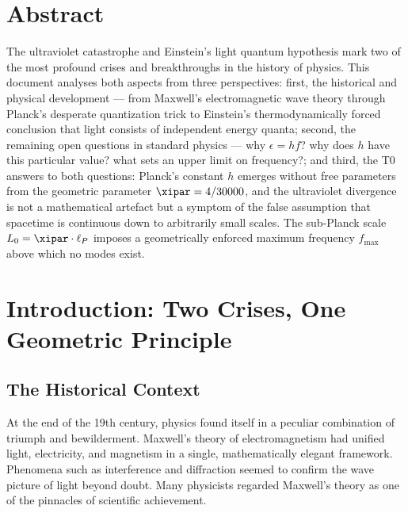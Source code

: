 
\section*{Abstract}

The ultraviolet catastrophe and Einstein's light quantum hypothesis mark two of the 
most profound crises and breakthroughs in the history of physics. This document 
analyses both aspects from three perspectives: first, the historical and physical 
development — from Maxwell's electromagnetic wave theory through Planck's desperate 
quantization trick to Einstein's thermodynamically forced conclusion that light consists 
of independent energy quanta; second, the remaining open questions in standard 
physics — why $\epsilon = hf$? why does $h$ have this particular value? what sets 
an upper limit on frequency?; and third, the T0 answers to both questions: Planck's 
constant $h$ emerges without free parameters from the geometric parameter 
$\xipar = 4/30000$, and the ultraviolet divergence is not a mathematical artefact 
but a symptom of the false assumption that spacetime is continuous down to arbitrarily 
small scales. The sub-Planck scale $L_0 = \xipar \cdot \ell_P$ imposes a geometrically 
enforced maximum frequency $f_{\max}$ above which no modes exist.

\clearpage

\section{Introduction: Two Crises, One Geometric Principle}
\label{sec:intro}

\subsection{The Historical Context}

At the end of the 19th century, physics found itself in a peculiar combination of 
triumph and bewilderment. Maxwell's theory of electromagnetism had unified light, 
electricity, and magnetism in a single, mathematically elegant framework. Phenomena 
such as interference and diffraction seemed to confirm the wave picture of light 
beyond doubt. Many physicists regarded Maxwell's theory as one of the pinnacles of 
scientific achievement.

